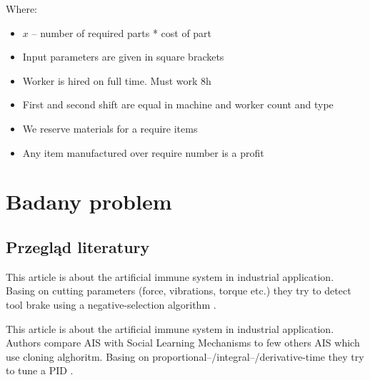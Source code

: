 \documentclass[a4paper]{article}
\begin{document}
Where:
\begin{itemize}
    \item $x$ -- number of required parts * cost of part
    \item Input parameters are given in square brackets
    \item Worker is hired on full time. Must work 8h
    \item First and second shift are equal in machine and worker count and type
    \item We reserve materials for a require items
    \item Any item manufactured over require number is a profit 
\end{itemize}


\section{Badany problem}
\subsection{Przegląd literatury}
This article is about the artificial immune system in industrial application. Basing on cutting parameters (force, vibrations, torque etc.) they try to detect tool brake using a negative-selection algorithm \cite{dasgupta1999artificial}.



This article is about the artificial immune system in industrial application. Authors compare AIS with Social Learning Mechanisms to few others AIS which use cloning alghoritm. Basing on proportional–/integral–/derivative-time they try to tune a PID \cite{wang_artificial_2017}.


\newpage
\printbibliography
\end{document}
